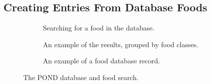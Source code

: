\subsection{Creating Entries From Database Foods}
\begin{figure}	
\centering
	\begin{subfigure}[t]{1.25in}
		\centering
		\setlength\fboxsep{0pt}
\setlength\fboxrule{0.5pt}
		\caption{Searching for a food in the database. }\label{fig:pond_search}
	\end{subfigure}
\quad
\begin{subfigure}[t]{1.25in}
		\centering
		\setlength\fboxsep{0pt}
\setlength\fboxrule{0.5pt}
		\caption{An example of the results, grouped by food classes.}\label{fig:pond_db_results}
	\end{subfigure}
\quad
\begin{subfigure}[t]{1.25in}
		\centering
		\setlength\fboxsep{0pt}
\setlength\fboxrule{0.5pt}
		\caption{An example of a food database record. }\label{fig:pond_db_record}
	\end{subfigure}
	\caption{The POND database and food search. }\label{fig:pond_database}
\end{figure}
